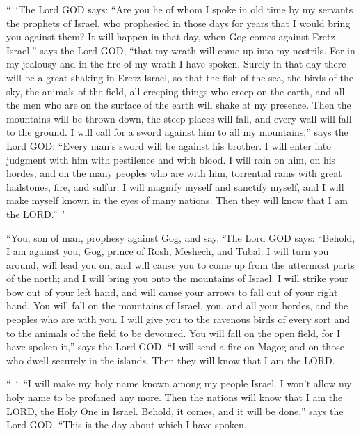 \myverse{}“ ‘The Lord GOD says: “Are you he of whom I spoke in old time
by my servants the prophets of Israel, who prophesied in those days for years that I would bring you against
them?
\myverse{}It will happen in that day, when Gog comes against Eretz-Israel,” says the
Lord GOD, “that my wrath will come up into my nostrils.
\myverse{}For in my jealousy and in the fire of my wrath I have spoken. Surely in that
day there will be a great shaking in Eretz-Israel,
\myverse{}so that the fish of the sea, the birds of the sky, the animals of the field,
all creeping things who creep on the earth, and all the men who are on the surface of the earth will shake
at my presence. Then the mountains will be thrown down, the steep places will fall, and every wall will
fall to the ground.
\myverse{}I will call for a sword against him to all my mountains,” says the Lord GOD.
“Every man’s sword will be against his brother.
\myverse{}I will enter into judgment with him with pestilence and with blood. I will
rain on him, on his hordes, and on the many peoples who are with him, torrential rains with great hailstones,
fire, and sulfur.
\myverse{}I will magnify myself and sanctify myself, and I will make myself known in
the eyes of many nations. Then they will know that I am the LORD.” ’


\mychapter{} \myverse*{}“You, son of man, prophesy against Gog, and say, ‘The Lord GOD
says: “Behold, I am against you, Gog, prince of Rosh, Meshech, and Tubal.
\myverse{}I will turn you around, will lead you on, and will cause you to come up from
the uttermost parts of the north; and I will bring you onto the mountains of Israel.
\myverse{}I will strike your bow out of your left hand, and will cause your arrows to
fall out of your right hand.
\myverse{}You will fall on the mountains of Israel, you, and all your hordes, and the
peoples who are with you. I will give you to the ravenous birds of every sort and to the animals of the
field to be devoured.
\myverse{}You will fall on the open field, for I have spoken it,” says the Lord GOD.
\myverse{}“I will send a fire on Magog and on those who dwell securely in the islands.
Then they will know that I am the LORD.

\myverse{}“ ‘ “I will make my holy name known among my people Israel. I won’t
allow my holy name to be profaned any more. Then the nations will know that I am the LORD, the Holy One
in Israel.
\myverse{}Behold, it comes, and it will be done,” says the Lord GOD. “This is the day
about which I have spoken.


